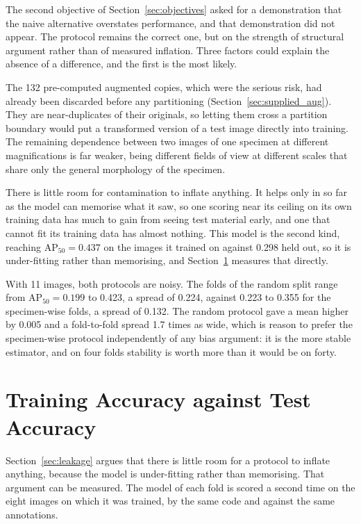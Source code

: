 The second objective of Section~\ref{sec:objectives} asked for a demonstration
that the naive alternative overstates performance, and that demonstration did not
appear. The protocol remains the correct one, but on the strength of
structural argument rather than of measured inflation. Three factors could
explain the absence of a difference, and the first is the most likely.

The 132 pre-computed augmented copies, which were the serious risk, had already
been discarded before any partitioning (Section~\ref{sec:supplied_aug}). They are
near-duplicates of their originals, so letting them cross a partition boundary
would put a transformed version of a test image directly into training. The remaining dependence between two images of
one specimen at different magnifications is far weaker, being different fields of
view at different scales that share only the general morphology of the specimen.

There is little room for contamination to inflate anything. It helps only in so
far as the model can memorise what it saw, so one scoring near its ceiling on its
own training data has much to gain from seeing test material early, and one that
cannot fit its training data has almost nothing. This model is the second kind,
reaching $\mathrm{AP}_{50} = 0.437$ on the images it trained on against 0.298
held out, so it is under-fitting rather than memorising, and
Section~\ref{sec:generalisation} measures that directly.

With 11 images, both protocols are noisy. The folds of the random split
range from $\mathrm{AP}_{50} = 0.199$ to 0.423, a spread of 0.224, against 0.223
to 0.355 for the specimen-wise folds, a spread of 0.132. The random protocol gave
a mean higher by 0.005 and a fold-to-fold spread 1.7 times as wide, which is
reason to prefer the specimen-wise protocol independently of any bias argument: it
is the more stable estimator, and on four folds stability is worth more than it
would be on forty.

\section{Training Accuracy against Test Accuracy}
\label{sec:generalisation}

Section~\ref{sec:leakage} argues that there is little room for a protocol to
inflate anything, because the model is under-fitting rather than memorising. That argument
can be measured. The model of each fold is scored a second time on the eight
images on which it was trained, by the same code and against the same
annotations.

